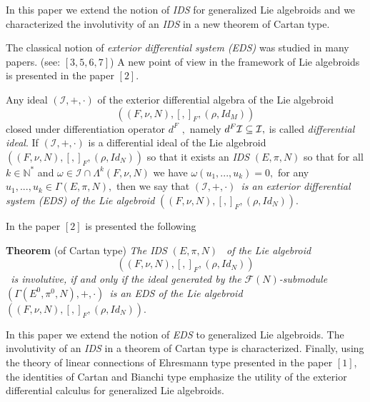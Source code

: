 \documentclass[11pt]{article}
\begin{document}
In this paper we extend the notion of \emph{IDS} for generalized Lie
algebroids and we characterized the involutivity of an \emph{IDS} in a new theorem
of Cartan type.

The classical notion of \emph{exterior differential system (EDS)} was
studied in many papers. (see: $[3,5,6,7]$) A new point of view in the
framework of Lie algebroids is presented in the paper $\left[ 2\right] .$

Any ideal $\left( \mathcal{I},+,\cdot \right) $ of the exterior differential
algebra of the Lie algebroid
\begin{equation*}
\left( \left( F,\nu ,N\right) ,\left[ ,\right] _{F},\left( \rho
,Id_{M}\right) \right)
\end{equation*}
closed under differentiation operator $d^{F}$ $,$ namely $d^{F}\mathcal{%
I\subseteq I},$ is called \emph{differential ideal}$.$ If $\left( \mathcal{I}%
,+,\cdot \right) $ is a differential ideal of the Lie algebroid $\left(
\left( F,\nu ,N\right) ,\left[ ,\right] _{F},\left( \rho ,Id_{N}\right)
\right) $ so that it exists an \emph{IDS} $\left( E,\pi ,N\right) $ so that
for all $k\in \mathbb{N}^{\ast }$ and $\omega \in \mathcal{I}\cap \Lambda
^{k}\left( F,\nu ,N\right) $ we have $\omega \left( u_{1},...,u_{k}\right)
=0,$ for any $u_{1},...,u_{k}\in \Gamma \left( E,\pi ,N\right) ,$ then we
say that $\left( \mathcal{I},+,\cdot \right) $\emph{\ is an exterior
differential system (EDS) of the Lie algebroid }$\left( \left( F,\nu
,N\right) ,\left[ ,\right] _{F},\left( \rho ,Id_{N}\right) \right) .$

In the paper $\left[ 2\right] $ is presented the following

\textbf{Theorem} (of Cartan type) \emph{The IDS }$\left( E,\pi ,N\right) $%
\emph{\ of the Lie algebroid }%
\begin{equation*}
\left( \left( F,\nu ,N\right) ,\left[ ,\right] _{F},\left( \rho
,Id_{N}\right) \right)
\end{equation*}%
\emph{\ is involutive, if and only if the ideal generated by the }$\mathcal{F%
}\left( N\right) $\emph{-submodule }$\left( \Gamma \left( E^{0},\pi
^{0},N\right) ,+,\cdot \right) $\emph{\ is an EDS of the Lie algebroid }$%
\left( \left( F,\nu ,N\right) ,\left[ ,\right] _{F},\left( \rho
,Id_{N}\right) \right) .$

In this paper we extend the notion of \emph{EDS} to generalized Lie
algebroids. The involutivity of an \emph{IDS} in a theorem of Cartan type is
characterized. Finally, using the theory of linear connections of Ehresmann
type presented in the paper $\left[ 1\right] $, the identities of Cartan and
Bianchi type emphasize the utility of the exterior differential calculus for generalized Lie algebroids. 
\end{document}
